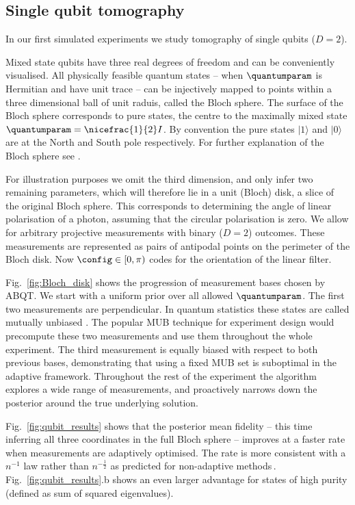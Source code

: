 \subsection{Single qubit tomography}

In our first simulated experiments we study tomography of single qubits ($D=2$).

Mixed state qubits have three real degrees of freedom and can be conveniently visualised. All physically feasible quantum states -- when $\quantumparam$ is Hermitian and have unit trace -- can be injectively mapped to points within a three dimensional ball of unit raduis, called the Bloch sphere. The surface of the Bloch sphere corresponds to pure states, the centre to the maximally mixed state $\quantumparam = \nicefrac{1}{2}I$. By convention the pure states $\vert 1 \rangle$ and $\vert 0 \rangle$ are at the North and South pole respectively. For further explanation of the Bloch sphere see \eg \citep[Chapter 2]{Petz2008}.

For illustration purposes we omit the third dimension, and only infer two remaining parameters, which will therefore lie in a unit (Bloch) disk, a slice of the original Bloch sphere. This corresponds to determining the angle of linear polarisation of a photon, assuming that the circular polarisation is zero. We allow for arbitrary projective measurements with binary ($D = 2$) outcomes. These measurements are represented as pairs of antipodal points on the perimeter of the Bloch disk. Now $\config\in[0,\pi)$ codes for the orientation of the linear filter.

Fig.\ \ref{fig:Bloch_disk} shows the progression of measurement bases chosen by ABQT. We start with a uniform prior over all allowed $\quantumparam$. The first two measurements are perpendicular. In quantum statistics these states are called mutually unbiased \citep{MUBExperiment}. The popular MUB technique for experiment design would precompute these two measurements and use them throughout the whole experiment. The third measurement is equally biased with respect to both previous bases, demonstrating that using a fixed MUB set is suboptimal in the adaptive framework. Throughout the rest of the experiment the algorithm explores a wide range of measurements, and proactively narrows down the posterior around the true underlying solution.

Fig.\ \ref{fig:qubit_results} shows that the posterior mean fidelity -- this time inferring all three coordinates in the full Bloch sphere -- improves at a faster rate when measurements are adaptively optimised. The rate is more consistent with a $n^{-1}$ law rather than $n^{-\frac{1}{2}}$ as predicted for non-adaptive methods\,\cite[][and refs.]{MUBExperiment}. Fig.\ \ref{fig:qubit_results}.b shows an even larger advantage for states of high purity (defined as sum of squared eigenvalues).

